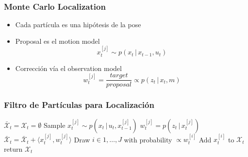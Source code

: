 


\begin{frame}
    \frametitle{Monte Carlo Localization}

    \begin{itemize}
        \item Cada partícula es una hipótesis de la pose
        \item Proposal es el motion model
        \begin{equation*}
            x_t^{[j]} \sim p(x_t \, | \, x_{t-1}, u_t)
        \end{equation*}
        \item Corrección vía el observation model
        \begin{equation*}
            w_t^{[j]} = \frac{target}{proposal} \propto p(z_t \, | \, x_t, m)
        \end{equation*}
    \end{itemize}
\end{frame}

    
\begin{frame}
    \frametitle{Filtro de Partículas para Localización}

    \begin{algorithmic}[1]
        \State $\bar{\mathcal{X}}_t = \mathcal{X}_t = \emptyset$
            \State Sample $x_t^{[j]} \sim p(x_t \, | \, u_t, x_{t-1}^{[j]})$
            \State $w_t^{[j]} = p(z_t \, | \, x_t^{[j]})$
            \State $\bar{\mathcal{X}}_t = \bar{\mathcal{X}}_t + \langle x_t^{[j]}, w_t^{[j]}\rangle$
        \EndFor
            \State Draw $i \in 1,\ldots,J$ with probability $\propto w_t^{[i]}$
            \State Add $x_t^{[i]}$ to $\mathcal{X}_t$
        \EndFor
        \State return $\mathcal{X}_t$
    \EndProcedure
    \end{algorithmic}
\end{frame}
    
